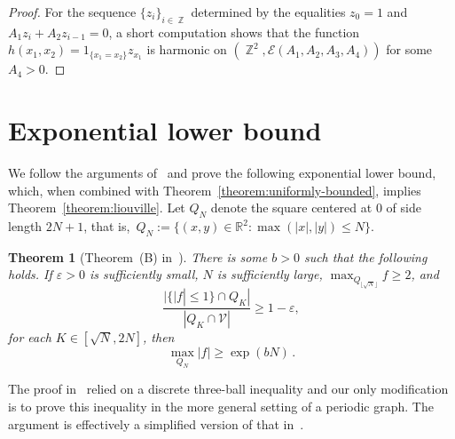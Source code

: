 \documentclass{daj}
\newtheorem{theorem}{Theorem}[section]
\newcommand{\V}{\mathcal{V}}
\newcommand{\eps}{\varepsilon}
\DeclareMathOperator{\Z}{\mathbb{Z}}
\begin{document}
\begin{proof}
	For the sequence $\{z_i\}_{i \in \Z}$ determined by the equalities $z_0 = 1$ and $A_1 z_{i}  + A_2 z_{i-1} = 0$,
	a short computation shows that
	the function $h(x_1, x_2) = 1_{\{ x_1 = x_2\}} z_{x_1}$
	is harmonic on $(\Z^2, \mathcal{E}(A_1,A_2,A_3,A_4))$ for some $A_4 > 0$.
\end{proof}




\appendix

\section{Exponential lower bound}

We follow the arguments of~\cite{buhovsky2022discrete} and prove the following exponential lower bound, which, when combined with Theorem~\ref{theorem:uniformly-bounded}, implies Theorem~\ref{theorem:liouville}. Let $Q_N$ denote the square centered at 0 of side length $2 N+1$, that is,~$Q_N := \{ (x,y) \in \mathbb{R}^2 : \max(|x|, |y| ) \leq N\}$.
\begin{theorem}[Theorem~(B) in~\cite{buhovsky2022discrete}]
	\label{theorem:lower-bound}
	There is some $b > 0$ such that the following holds. If $\varepsilon > 0$ is sufficiently small, $N$ is sufficiently large, $\max_{Q_{\lfloor \sqrt{N} \rfloor}} f \geq 2$, and
	\begin{equation*}
		\frac{|\{|f| \leq 1\} \cap Q_K|}{|Q_K \cap \V|} \geq 1-\eps,
	\end{equation*}
	for each $K \in [\sqrt{N}, 2N]$, then
	\begin{equation}
		\label{eq:exp-growth-statement}
		\max_{Q_{N}} |f| \geq \exp(bN) \, .
	\end{equation}
\end{theorem}
The proof in~\cite{buhovsky2022discrete} relied on a discrete three-ball inequality and our only modification is to prove this inequality in the more general setting of a periodic graph. The argument is effectively a simplified version of that in~\cite{armstrong2023large}.
\end{document}
